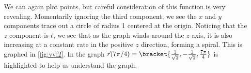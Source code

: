 {We can again plot points, but careful consideration of this function is very revealing. Momentarily ignoring the third component, we see the $x$ and $y$ components trace out a circle of radius 1 centered at the origin. Noticing that the $z$ component is $t$, we see that as the graph winds around the $z$-axis, it is also increasing at a constant rate in the positive $z$ direction, forming a spiral. This is graphed in \autoref{fig:vvf2}. In the graph $\vec r(7\pi/4)=\bracket{\frac1{\sqrt2},-\frac1{\sqrt2},\frac{7\pi}4}%
$ is highlighted to help us understand the graph.}

%
%

